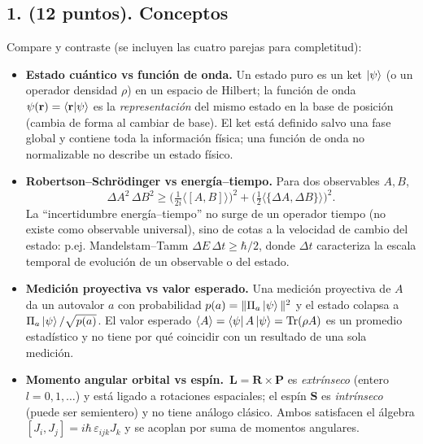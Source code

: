 \documentclass[a4paper,11pt]{article}
\begin{document}
\subsection*{1. (12 puntos). Conceptos}
Compare y contraste (se incluyen las cuatro parejas para completitud):
\begin{itemize}
  \item \textbf{Estado cuántico vs función de onda.} Un estado puro es un ket $\ket{\psi}$ (o un operador densidad $\rho$) en un espacio de Hilbert; la función de onda $\psi(\mathbf{r})=\braket{\mathbf{r}|\psi}$ es la \emph{representación} del mismo estado en la base de posición (cambia de forma al cambiar de base). El ket está definido salvo una fase global y contiene toda la información física; una función de onda no normalizable no describe un estado físico.
  \item \textbf{Robertson–Schrödinger vs energía–tiempo.} Para dos observables $A,B$,
  \[
  \Delta A^2\,\Delta B^2\ge \Big(\tfrac{1}{2i}\langle[A,B]\rangle\Big)^2+\Big(\tfrac{1}{2}\langle\{\Delta A,\Delta B\}\rangle\Big)^2.
  \]
  La “incertidumbre energía–tiempo” no surge de un operador tiempo (no existe como observable universal), sino de cotas a la velocidad de cambio del estado: p.ej. Mandelstam–Tamm $\Delta E\,\Delta t\ge \hbar/2$, donde $\Delta t$ caracteriza la escala temporal de evolución de un observable o del estado.
  \item \textbf{Medición proyectiva vs valor esperado.} Una medición proyectiva de $A$ da un autovalor $a$ con probabilidad $p(a)=\|\Pi_a\ket{\psi}\|^2$ y el estado colapsa a $\Pi_a\ket{\psi}/\sqrt{p(a)}$. El valor esperado $\langle A\rangle=\bra{\psi}A\ket{\psi}=\mathrm{Tr}(\rho A)$ es un promedio estadístico y no tiene por qué coincidir con un resultado de una sola medición.
  \item \textbf{Momento angular orbital vs espín.} $\,\mathbf{L}=\mathbf{R}\times\mathbf{P}$ es \emph{extrínseco} (entero $l=0,1,\dots$) y está ligado a rotaciones espaciales; el espín $\mathbf{S}$ es \emph{intrínseco} (puede ser semientero) y no tiene análogo clásico. Ambos satisfacen el álgebra $[J_i,J_j]=i\hbar\,\varepsilon_{ijk}J_k$ y se acoplan por suma de momentos angulares.
\end{itemize}
\end{document}
